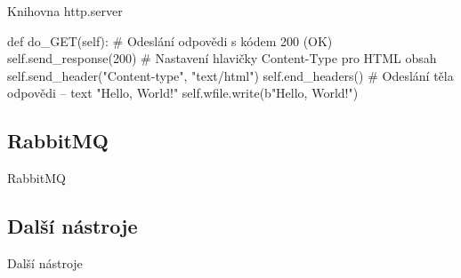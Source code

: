 \documentclass{beamer}
\begin{document}
\begin{frame}{Knihovna http.server}
    \begin{semiverbatim}
	def do_GET(self):
		# Odeslání odpovědi s kódem 200 (OK)
		self.send_response(200)
		# Nastavení hlavičky Content-Type pro HTML obsah
		self.send_header("Content-type", "text/html") 
		self.end_headers()
		# Odeslání těla odpovědi – text "Hello, World!"     
		self.wfile.write(b"Hello, World!") 
    \end{semiverbatim}
\end{frame}

\subsection{RabbitMQ}
\begin{frame}{RabbitMQ}

\end{frame}

\subsection{Další nástroje}
\begin{frame}{Další nástroje}

\end{frame}
\end{document}

